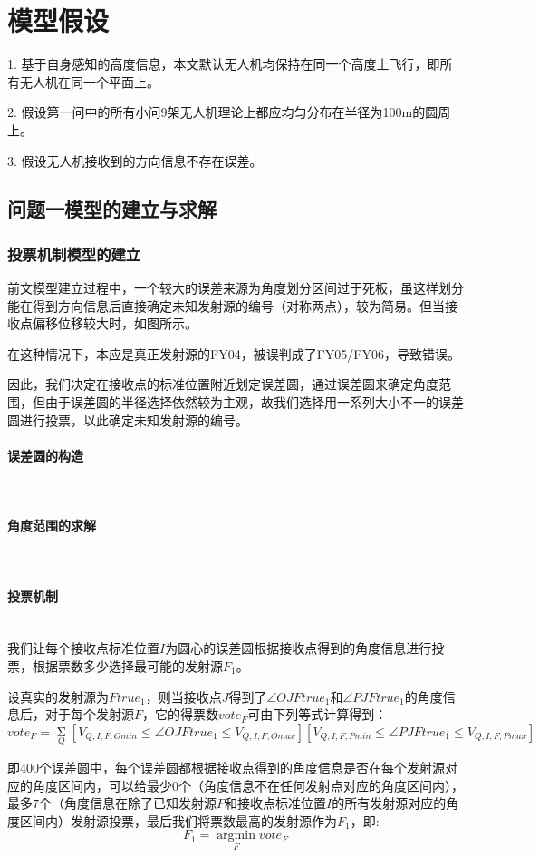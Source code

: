 \documentclass{ctexart}
\newcommand{\subsubsubsection}[1]{\paragraph{#1}\mbox{}\\}
\begin{document}
\section{模型假设}
1. \quad 基于自身感知的高度信息，本文默认无人机均保持在同一个高度上飞行，即所有无人机在同一个平面上。

2. \quad 假设第一问中的所有小问9架无人机理论上都应均匀分布在半径为100m的圆周上。

3. \quad 假设无人机接收到的方向信息不存在误差。


\subsection{问题一模型的建立与求解}

  \subsubsection{投票机制模型的建立}

  前文模型建立过程中，一个较大的误差来源为角度划分区间过于死板，虽这样划分能在得到方向信息后直接确定未知发射源的编号（对称两点），较为简易。但当接收点偏移位移较大时，如图所示。
  
  在这种情况下，本应是真正发射源的FY04，被误判成了FY05/FY06，导致错误。
  
  因此，我们决定在接收点的标准位置附近划定误差圆，通过误差圆来确定角度范围，但由于误差圆的半径选择依然较为主观，故我们选择用一系列大小不一的误差圆进行投票，以此确定未知发射源的编号。

  \subsubsubsection{误差圆的构造}



  \subsubsubsection{角度范围的求解}

  \subsubsubsection{投票机制}

    我们让每个接收点标准位置$I$为圆心的误差圆根据接收点得到的角度信息进行投票，根据票数多少选择最可能的发射源$F_1$。

    设真实的发射源为$Ftrue_1$，则当接收点$J$得到了$\angle OJFtrue_1$和$\angle PJFtrue_1$的角度信息后，对于每个发射源$F$，它的得票数$vote_F$可由下列等式计算得到：
\begin{equation}
    vote_F=\mathop{\Sigma}\limits_{Q} [V_{Q,I,F,Omin} \le \angle OJFtrue_1 \le V_{Q,I,F,Omax}][V_{Q,I,F,Pmin} \le \angle PJFtrue_1 \le V_{Q,I,F,Pmax}]
\end{equation}


    即400个误差圆中，每个误差圆都根据接收点得到的角度信息是否在每个发射源对应的角度区间内，可以给最少$0$个（角度信息不在任何发射点对应的角度区间内），最多$7$个（角度信息在除了已知发射源$P$和接收点标准位置$I$的所有发射源对应的角度区间内）发射源投票，最后我们将票数最高的发射源作为$F_1$，即:
\begin{equation}
 F_1=\mathop{\arg\min}\limits_{F} vote_F
\end{equation}
\end{document}
